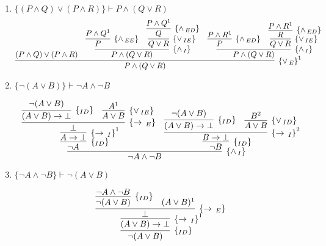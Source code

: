 \begin{enumerate}
\begin{enumerate}
	\item $\{(P\land Q)\lor(P\land R)\}\vdash P\land(Q \lor R)$ 
	\[
     	\infer[\orE^1]
              {P \land (Q \lor R)}
              {
                (P\land Q)\lor(P\land R) 
                &
                \infer[\andI]
                         {P\land (Q \lor R)}
                         {
                           \infer[\andEE]
                                    {P}
                                    {P \land Q^1}
                            &
                            \infer[\orIE]
                                     {Q \lor R}
                                     {
                                         \infer[\andED]
                                                  {Q}
                                                  {P \land Q^1}
                                     } 
                         }
                 &
                \infer[\andI]
                         {P \land (Q \lor R)}
                         {
                           \infer[\andED]
                                    {P}
                                    {P \land R^1}
                            &
                            \infer[\orIE]
                                     {Q \lor R}
                                     {
                                         \infer[\andED]
                                                  {R}
                                                  {P \land R^1}
                                     }
                         }
              }
     \]

	\item $\{\neg(A \lor B)\}\vdash \neg A \land \neg B$
	
	\[
		\infer[\andI]
			{\neg A \land \neg B}
			{
			 \infer[\Id]
			 	{\neg A}
			 	{
			 		\infer[\impI^1]
			 			{A \to \bot}
			 			{
			 				\infer[\impE]
			 					{\bot}
			 					{
			 						\infer[\Id]
			 							{(A \lor B) \to \bot}
			 							{\neg(A \lor B)}
			 					&
			 						\infer[\orIE]
			 							{A \lor B}
			 							{A^1}
			 					}
			 			}
			 	}
				&
			 \infer[\Id]
			 	{\neg B}
			 	{
			 		\infer[\impI^2]
			 			{B \to \bot}
			 			{
			 				\infer[\Id]
			 					{(A \lor B) \to \bot}
			 					{\neg(A \lor B)}
			 			&
			 				\infer[\orID]
			 					{A \lor B}
			 					{B^2}
			 			}
			 	}
			}
	\]
	
	\item $\{\neg A \land \neg B\}\vdash \neg (A\lor B)$
	
	\[
		\infer[\Id]
			{\neg (A\lor B)}
			{
				\infer[\impI^1]
					{(A \lor B) \to \bot}
					{
						\infer[\impE]
							{\bot}
							{
								\infer[\Id]
									{\neg(A \lor B)}
									{\neg A \land \neg B}
								&
								(A \lor B)^1	
							}
					}
			}
	\]
	

\end{enumerate}
\end{enumerate}
